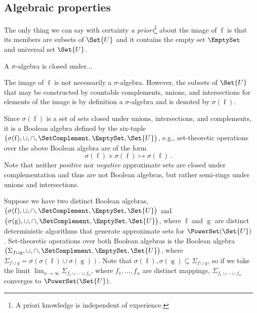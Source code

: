 \documentclass[ ../main.tex]{subfiles}
\begin{document}
\subsection{Algebraic properties}
The only thing we can say with certainty \emph{a priori}\footnote{A priori 
knowledge is independent of experience.}  about the image of $\operatorname{f}$ 
is that its members are subsets of $\Set{U}$ and it contains the empty set 
$\EmptySet$ and universal set $\Set{U}$.
\begin{definition}
A $\sigma$-algebra is closed under...
\end{definition}
The image of $\operatorname{f}$ is not necessarily a $\sigma$-algebra. However, 
the subsets of $\Set{U}$ that may be constructed by countable complements, 
unions, and intersections for elements of the image is by definition a 
$\sigma$-algebra and is denoted by $\sigma(\operatorname{f})$.

Since $\sigma(\operatorname{f})$ is a set of sets closed under unions, 
intersections, and complements, it is a Boolean algebra defined by the six-tuple 
$\left(
    \sigma(\operatorname{f}), \cup, \cap, \SetComplement, \EmptySet,\Set{U}
\right)$,
e.g., set-theoretic operations over the above Boolean algebra are of the form
\begin{equation}
    \sigma(\operatorname{f}) \times \sigma(\operatorname{f}) 
        \mapsto \sigma(\operatorname{f})\,.
\end{equation}
Note that neither \emph{positive} nor \emph{negative} approximate sets are closed under complementation and thus are not Boolean algebras, but rather semi-rings under unions and intersections.

Suppose we have two distinct Boolean algebras,
$\left(
    \sigma(\operatorname{f}), \cup, \cap, \SetComplement, \EmptySet,\Set{U}
\right)$ and 
$\left(
    \sigma(\operatorname{g}), \cup, \cap, \SetComplement, \EmptySet,\Set{U}
\right)$,
where $\operatorname{f}$ and $\operatorname{g}$ are distinct deterministic
algorithms that generate approximate sets for $\PowerSet(\Set{U})$.
Set-theoretic operations over both Boolean algebras is the Boolean algebra
$\left(
    \Sigma_{f \cup g}, \cup, \cap, \SetComplement, \EmptySet,\Set{U}
\right)$,
where $\Sigma_{f \cup g} = 
    \sigma\!\left(\sigma(\operatorname{f}) \cup \sigma(\operatorname{g})
\right)$.
Note that $\sigma(\operatorname{f}), \sigma(\operatorname{g}) 
    \subseteq \Sigma_{f \cup g}$,
so if we take the limit
    $\lim_{n \to \infty} \Sigma_{f_1 \cup \cdots \cup f_n}$,
where $f_1,\ldots,f_n$ are distinct mappings, $\Sigma_{f_1 \cup \cdots \cup f_n}$ converges to $\PowerSet(\Set{U})$.
\end{document}
